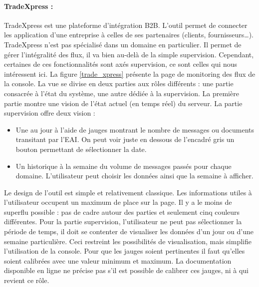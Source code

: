 			\paragraph{TradeXpress :}
			TradeXpress est une plateforme d’intégration B2B. L’outil permet de connecter
			les application d’une entreprise à celles de ses partenaires (clients,
			fournisseurs…). TradeXpress n’est pas spécialisé dans un domaine en
			particulier. Il permet de gérer l’intégralité des flux, il va bien au-delà
			de la simple supervision. Cependant, certaines de ces fonctionnalités sont
			axés supervision, ce sont celles qui nous intéressent ici. La figure
			\ref{trade_xpress} présente la page de monitoring des flux de la console.\newline
			La vue se divise en deux parties aux rôles différents : une partie consacrée
			à l’état du système, une autre dédiée à la supervision. La première partie
			montre une vision de l’état actuel (en temps réel) du serveur. La partie
			supervision offre deux vision :
			\begin{itemize}
			  \item Une au jour à l’aide de jauges montrant le nombre de messages ou
			  documents transitant par l’EAI. On peut voir juste en dessous de l’encadré
			  gris un bouton permettant de sélectionner la date.
			  \item Un historique à la semaine du volume de messages passés pour chaque
			  domaine. L’utilisateur peut choisir les données ainsi que la semaine à
			  afficher.
			\end{itemize}
			Le design de l’outil est simple et relativement classique. Les informations
			utiles à l’utilisateur occupent un maximum de place sur la page. Il y a le
			moins de superflu possible : pas de cadre autour des parties et seulement
			cinq couleurs différentes.\newline
			Pour la partie supervision, l’utilisateur ne peut pas sélectionner la
			période de temps, il doit se contenter de visualiser les données d’un jour
			ou d’une semaine particulière. Ceci restreint les possibilités de
			visualisation, mais simplifie l’utilisation de la console.\newline
			Pour que les jauges soient pertinentes il faut qu’elles soient calibrées avec
			une valeur minimum et maximum. La documentation disponible en ligne ne précise
			pas s’il est possible de calibrer ces jauges, ni à qui revient ce rôle.
